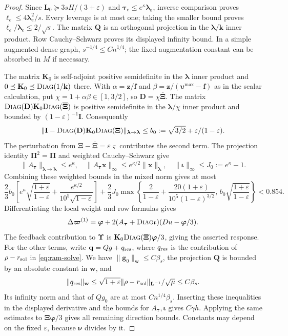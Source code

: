 \documentclass[11pt]{article}
\theoremstyle{remark}
\newcommand{\II}{\mathbf I}
\newcommand{\LL}{\mathbf L}
\newcommand{\PPi}{\boldsymbol{\Pi}}
\newcommand{\ff}{\mathbf f}
\newcommand{\llambda}{\boldsymbol{\lambda}}
\newcommand{\ttau}{\boldsymbol{\tau}}
\newcommand{\ww}{\mathbf w}
\newcommand{\zz}{\mathbf z}
\newcommand{\vvs}{\boldsymbol{\varsigma}}
\newcommand{\vvp}{\boldsymbol{\varpi}}
\newcommand{\vvu}{\boldsymbol{\upsilon}}
\newcommand{\XXi}{\boldsymbol{\Xi}}
\newcommand{\XXibar}{\overline{\boldsymbol{\Xi}}}
\newcommand{\UUps}{\boldsymbol{\Upsilon}}
\newcommand{\DD}{\mathbf D}
\newcommand{\QQ}{\mathbf Q}
\newcommand{\KK}{\mathbf K}
\renewcommand{\gg}{\mathbf g}
\newcommand{\qq}{\mathbf q}
\newcommand{\kk}{\mathbf k}
\newcommand{\xx}{\mathbf x}
\newcommand{\nnu}{\boldsymbol{\nu}}
\newcommand{\pphi}{\boldsymbol{\varphi}}
\newcommand{\iiota}{\boldsymbol{\iota}}
\newcommand{\diag}{\textsc{Diag}}
\newcommand{\norm}[1]{\lVert#1\rVert}
\begin{document}
\begin{proof}
Since $\LL_0\succeq3sH/(3+\varepsilon)$ and $\ttau_e\le e^\kappa\llambda_e$,
inverse comparison proves $\ell_e\le4\llambda_e^2/s$.
Every leverage is at most one; taking the smaller bound proves
$\ell_e/\llambda_e\le2/\sqrt s$.
The matrix $\QQ$ is an orthogonal projection in the $\llambda/\kk$ inner product.
Row Cauchy--Schwarz proves its displayed infinity bound.
In a simple augmented dense graph, $s^{-1/4}\le Cn^{1/4}$; the fixed
augmentation constant can be absorbed in $M$ if necessary.

The matrix $\KK_0$ is self-adjoint positive semidefinite in the $\llambda$ inner
product and $0\preceq \KK_0\preceq\diag(1/\kk)$ there.
With $\alpha=\zz/\ff$ and $\beta=\zz/(\vvu^{\max}-\ff)$ as in the scalar calculation, put
$\chi=1+\alpha\beta\in[1,3/2]$, so $\DD=\chi \XXibar$.
The matrix $\diag(\DD)\KK_0\diag(\XXibar)$ is positive semidefinite in the
$\llambda/\chi$ inner product and bounded by $(1-\varepsilon)^{-1}\II$.
Consequently
\[
 \norm{\II-\diag(\DD)\KK_0\diag(\XXi)
                }_{\llambda\to\llambda}
 \le b_0:=\sqrt{3/2}+\varepsilon/(1-\varepsilon).
\]
The perturbation from $\XXi-\XXibar=\varepsilon\vvs$ contributes the second term.
The projection identity $\PPi^2=\PPi$ and weighted Cauchy--Schwarz give
\[
 \norm{A_{\ttau}}_{\llambda\to\llambda}\le e^\kappa,
 \quad \norm{A_{\ttau}\xx}_\infty\le e^{\kappa/2}\norm{\xx}_{\llambda},
 \quad \norm{\iiota}_\infty\le J_0:=e^\kappa-1.
\]
Combining these weighted bounds in the mixed norm gives at most
\[
 \frac23 b_0\left[e^\kappa\sqrt{\frac{1+\varepsilon}{1-\varepsilon}}
       +\frac{e^{\kappa/2}}{10^5\sqrt{1-\varepsilon}}\right]
 +\frac23J_0\max\left\{
 \frac2{1-\varepsilon}+
 \frac{20(1+\varepsilon)}{10^5(1-\varepsilon)^{3/2}},\,
 b_0\sqrt{\frac{1+\varepsilon}{1-\varepsilon}}\right\}<0.854.
\]
Differentiating the local weight and row formulas gives
\[
 \Delta\vvp^{(1)}=\pphi+
       2(A_{\ttau}+\diag\iiota)(Du-\pphi/3).
\]
The feedback contribution to $\UUps$ is $\KK_0\diag(\XXi)\pphi/3$, giving the asserted
response.
For the other terms, write $\qq=Qg+q_{\rm res}$, where $q_{\rm res}$ is the
contribution of $\rho-r_{\rm sol}$ in \eqref{eq:ram-solve}.
We have $\norm{\gg_0}_{\ww}\le C\beta_s$, the projection $\QQ$ is bounded by an absolute
constant in $\ww$, and
\[
 \norm{q_{\rm res}}_{\ww}
 \le\sqrt{1+\varepsilon}
    \norm{\rho-r_{\rm sol}}_{\LL^{-1}}/\sqrt\mu
 \le C\beta_s.
\]
Its infinity norm and that of $Qg_0$ are at most $Cn^{1/4}\beta_s$.
Inserting these inequalities in the displayed derivative and the bounds for
$A_{\ttau},\iiota$ gives $C\gamma h$.
Applying the same estimates to $\XXi\pphi/3$ gives all remaining direction
bounds.
Constants may depend on the fixed $\varepsilon$, because $\nnu$ divides by it.
\end{proof}
\end{document}
